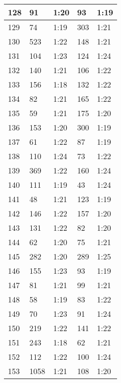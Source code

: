 \begin{center}
\begin{longtable}{|p{2cm}|l|l|l|l|}
128	&   91            &  1:20  &		93      	& 1:19 \\ \hline
129	&   74            &  1:19  &		303     	& 1:21 \\ \hline
130	&   523           &  1:22  &		148     	& 1:21 \\ \hline
131	&   104           &  1:23  &		124     	& 1:24 \\ \hline
132	&   140           &  1:21  &		106     	& 1:22 \\ \hline
133	&   156           &  1:18  &		132     	& 1:22 \\ \hline
134	&   82            &  1:21  &		165     	& 1:22 \\ \hline
135	&   59            &  1:21  &		175     	& 1:20 \\ \hline
136	&   153           &  1:20  &		300     	& 1:19 \\ \hline
137	&   61            &  1:22  &		87      	& 1:19 \\ \hline
138	&   110           &  1:24  &		73      	& 1:22 \\ \hline
139	&   369           &  1:22  &		160     	& 1:24 \\ \hline
140	&   111           &  1:19  &		43      	& 1:24 \\ \hline
141	&   48            &  1:21  &		123     	& 1:19 \\ \hline
142	&   146           &  1:22  &		157     	& 1:20 \\ \hline
143	&   131           &  1:22  &		82      	& 1:20 \\ \hline
144	&   62            &  1:20  &		75      	& 1:21 \\ \hline
145	&   282           &  1:20  &		289     	& 1:25 \\ \hline
146	&   155           &  1:23  &		93      	& 1:19 \\ \hline
147	&   81            &  1:21  &		99      	& 1:21 \\ \hline
148	&   58            &  1:19  &		83      	& 1:22 \\ \hline
149	&   70            &  1:23  &		91      	& 1:24 \\ \hline
150	&   219           &  1:22  &		141     	& 1:22 \\ \hline
151	&   243           &  1:18  &		62          & 1:21 \\ \hline
152	&   112           &  1:22  &		100     	& 1:24 \\ \hline
153	&   1058          &  1:21  &		108     	& 1:20 \\ \hline

\end{longtable}
\end{center}
